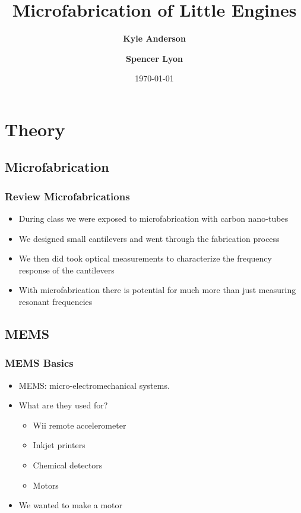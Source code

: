 \documentclass[11pt]{beamer}
\title[Micro Engines]{Microfabrication of Little Engines}
\author[Anderson and Lyon]{\textbf{Kyle Anderson} \and \textbf{Spencer Lyon}}
\date{\today}
\theoremstyle{definition}
\begin{document}
\frame{\titlepage}


\section{Theory} \label{sec:theory}

  \subsection{Microfabrication} \label{sub:microfabrication}

    \begin{frame} \frametitle{Review Microfabrications}
    \begin{itemize}[<+->]
      \item During class we were exposed to microfabrication with carbon nano-tubes
      \item We designed small cantilevers and went through the fabrication process
      \item We then did took optical measurements to characterize the frequency response of the cantilevers
      \item With microfabrication there is potential for much more than just measuring resonant frequencies
    \end{itemize}
    \end{frame}

  \subsection{MEMS} \label{sub:mems}

    \begin{frame} \frametitle{MEMS Basics}
    \begin{itemize}[<+->]
      \item MEMS: micro-electromechanical systems.
      \item What are they used for?
      \begin{itemize}
        \item Wii remote accelerometer
        \item Inkjet printers
        \item Chemical detectors
        \item Motors
      \end{itemize}
      \item We wanted to make a motor
    \end{itemize}
    \end{frame}
\end{document}
